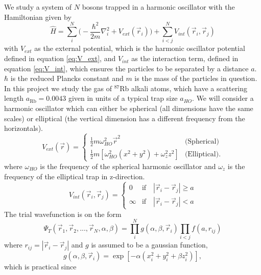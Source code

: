 \documentclass[norsk,a4paper,12pt]{article}
\begin{document}
We study a system of $N$ bosons trapped in a harmonic oscillator with the Hamiltonian given by 
\begin{equation}
\hat{H}=\sum_i^N\bigg(-\frac{\hbar^2}{2m}\nabla_i^2+V_{ext}(\vec{r}_i)\bigg)+\sum_{i<j}^NV_{int}(\vec{r}_i,\vec{r}_j)
\label{eq:Hamilton}
\end{equation}
with $V_{ext}$ as the external potential, which is the harmonic oscillator potential defined in equation \ref{eq:V_ext}, and $V_{int}$ as the interaction term, defined in equation \ref{eq:V_int}, which ensures the particles to be separated by a distance $a$. $\hbar$ is the reduced Plancks constant and $m$ is the mass of the particles in question. In this project we study the gas of $^{87}$Rb alkali atoms, which have a scattering length $a_{\text{Rb}}=0.0043$ given in units of a typical trap size $a_{HO}$. We will consider a harmonic oscillator which can either be spherical (all dimensions have the same scales) or elliptical (the vertical dimension has a different frequency from the horizontals).
\begin{equation}
\label{eq:V_ext}
V_{ext}(\vec{r})=
\begin{cases} 
   \frac{1}{2}m\omega_{HO}^2\vec{r}^2 & \text{(Spherical)} \\
   \frac{1}{2}m[\omega_{HO}^2(x^2 + y^2) + \omega_z^2z^2] & \text{(Elliptical)}.
\end{cases}
\end{equation}
where $\omega_{HO}$ is the frequency of the spherical harmonic oscillator and $\omega_z$ is the frequency of the elliptical trap in z-direction. 
\begin{equation}
\label{eq:V_int}
V_{int}(\vec{r}_i, \vec{r}_j)=
\begin{cases} 
0 & \text{if}\quad |\vec{r}_i-\vec{r}_j| \geq a \\
\infty & \text{if}\quad |\vec{r}_i-\vec{r}_j| < a
\end{cases}
\end{equation}
The trial wavefunction is on the form 
\begin{equation}
\Psi_T(\vec{r}_1, \vec{r}_2, ..., \vec{r}_N, \alpha, \beta)=\prod_i^Ng(\alpha, \beta, \vec{r}_i)\prod_{i<j}f(a,r_{ij})
\label{eq:WF}
\end{equation}
where $r_{ij}=|\vec{r}_i-\vec{r}_j|$ and $g$ is assumed to be a gaussian function,
\begin{equation}
g(\alpha, \beta, \vec{r}_i)=\exp[-\alpha(x_i^2+y_i^2+\beta z_i^2)],
\end{equation}
which is practical since
\end{document}
